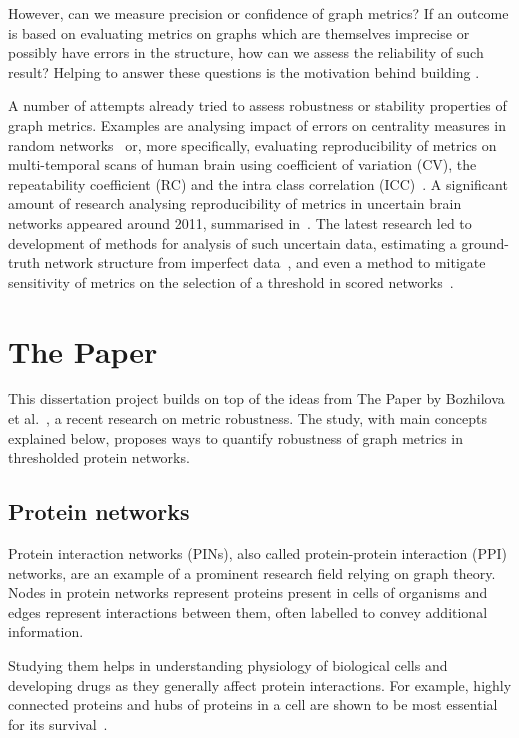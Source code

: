 However, can we measure precision or confidence of graph metrics?
If an outcome is based on evaluating metrics on graphs which are themselves imprecise or possibly have errors in the structure, how can we assess the reliability of such result?
Helping to answer these questions is the motivation behind building \graffs.

A number of attempts already tried to assess robustness or stability properties of graph metrics.
Examples are analysing impact of errors on centrality measures in random networks~\cite{BorgattiRobustnessCentralityMeasures2006} or, more specifically, evaluating reproducibility of metrics on multi-temporal scans of human brain using coefficient of variation (CV), the repeatability coefficient (RC) and the intra class correlation (ICC)~\cite{VaessenEffectReproducibilityDifferent2010,DennisTestRetestReliabilityGraph2012}.
A significant amount of research analysing reproducibility of metrics in uncertain brain networks appeared around 2011, summarised in~\cite{TelesfordExplorationGraphMetric2013}.
The latest research led to development of methods for analysis of such uncertain data, estimating a ground-truth network structure from imperfect data~\cite{Martin2016,Newman2018}, and even a method to mitigate sensitivity of metrics on the selection of a threshold in scored networks~\cite{Drakesmith2015}.


\section{The Paper}

This dissertation project builds on top of the ideas from The Paper by Bozhilova et al.~\cite{Bozhilova2019}, a recent research on metric robustness.
The study, with main concepts explained below, proposes ways to quantify robustness of graph metrics in thresholded protein networks.

\subsection{Protein networks}

Protein interaction networks (PINs), also called protein-protein interaction (PPI) networks, are an example of a prominent research field relying on graph theory.
Nodes in protein networks represent proteins present in cells of organisms and edges represent interactions between them, often labelled to convey additional information.

Studying them helps in understanding physiology of biological cells and developing drugs as they generally affect protein interactions.
For example, highly connected proteins and hubs of proteins in a cell are shown to be most essential for its survival~\cite{JeongLethalityCentralityProtein2001,HeWhyHubsTend2006}.

